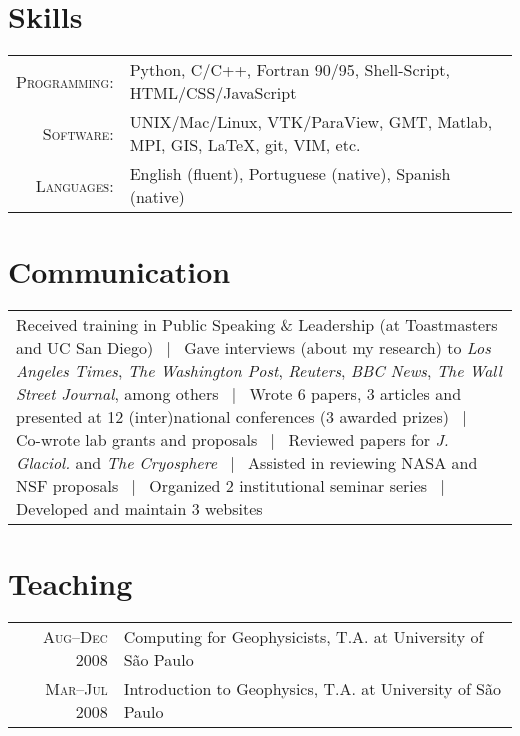 \documentclass[a4paper,11pt]{article}
\begin{document}

\section{Skills}

\begin{tabular}{rp{}}
\textsc{Programming:} & Python, C/C++, Fortran 90/95, Shell-Script, HTML/CSS/JavaScript\\
\textsc{Software:} & UNIX/Mac/Linux, VTK/ParaView, GMT, Matlab, MPI, GIS, \LaTeX, git, VIM, etc.\\
\textsc{Languages:} & English (fluent), Portuguese (native), Spanish (native)
\end{tabular}


\section{Communication}

\begin{tabular}{p{\textwidth}}
Received training in Public Speaking \& Leadership (at Toastmasters and UC San Diego) ~|~ Gave interviews (about my research) to {\it Los Angeles Times}, {\it The Washington Post}, {\it Reuters}, {\it BBC News}, {\it The Wall Street Journal}, among others ~|~ Wrote 6 papers, 3 articles and presented at 12 (inter)national conferences (3 awarded prizes) ~|~ Co-wrote lab grants and proposals ~|~ Reviewed papers for {\it J. Glaciol.} and {\it The Cryosphere} ~|~ Assisted in reviewing NASA and NSF proposals ~|~ Organized 2 institutional seminar series ~|~ Developed and maintain 3 websites
\end{tabular}


\section{Teaching}

\begin{tabular}{rl}
\textsc{Aug--Dec} 2008 & Computing for Geophysicists, T.A. at University of S\~ao Paulo\\
\textsc{Mar--Jul} 2008 & Introduction to Geophysics, T.A. at University of S\~ao Paulo
\end{tabular}
\end{document}
